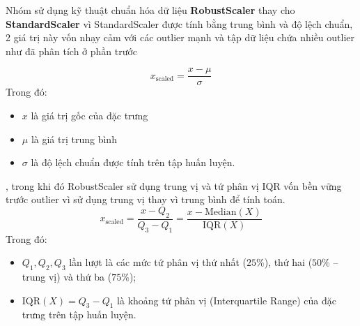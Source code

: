 Nhóm sử dụng kỹ thuật chuẩn hóa dữ liệu \textbf{RobustScaler} thay cho \textbf{StandardScaler} vì StandardScaler được tính bằng trung bình và độ lệch chuẩn, 2 giá trị này vốn nhạy cảm với các outlier mạnh và tập dữ liệu chứa nhiều outlier như đã phân tích ở phần trước

\begin{equation}
    x_{\text{scaled}} = \frac{x - \mu}{\sigma}
\end{equation}
Trong đó:
\begin{itemize}
    \item $x$ là giá trị gốc của đặc trưng
    \item $\mu$ là giá trị trung bình 
    \item $\sigma$ là độ lệch chuẩn được tính trên tập huấn luyện.
\end{itemize}

, trong khi đó RobustScaler sử dụng trung vị và tứ phân vị IQR vốn bền vững trước outlier vì sử dụng trung vị thay vì trung bình để tính toán.
\begin{equation}
    x_{\text{scaled}} = \frac{x - Q_2}{Q_3 - Q_1} = \frac{x - \text{Median}(X)}{\text{IQR}(X)}
\end{equation}
Trong đó:
\begin{itemize}
    \item $Q_1, Q_2, Q_3$ lần lượt là các mức tứ phân vị thứ nhất ($25\%$), thứ hai ($50\%$ -- trung vị) và thứ ba ($75\%$);
    \item $\text{IQR}(X) = Q_3 - Q_1$ là khoảng tứ phân vị (Interquartile Range) của đặc trưng trên tập huấn luyện.
\end{itemize}


